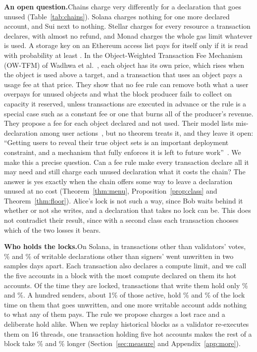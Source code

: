\documentclass[conference,compsoc]{IEEEtran}
\numberwithin{equation}{section}
\theoremstyle{plain}
\theoremstyle{definition}
\theoremstyle{remark}
\newcommand{\runin}[1]{\par\smallskip\noindent\textbf{#1.}\enspace}
\begin{document}
\runin{An open question}Chains charge very differently for a declaration that goes unused (Table~\ref{tab:chains}). Solana charges nothing for one more declared account, and Sui next to nothing. Stellar charges for every resource a transaction declares, with almost no refund, and Monad charges the whole gas limit whatever is used. A storage key on an Ethereum access list pays for itself only if it is read with probability at least \listThresholdKey{}. In the Object-Weighted Transaction Fee Mechanism (OW-TFM) of Wadhwa et al.~\cite{wadhwa2026perils}, each object has its own price, which rises when the object is used above a target, and a transaction that uses an object pays a usage fee at that price. They show that no fee rule can remove both what a user overpays for unused objects and what the block producer fails to collect on capacity it reserved, unless transactions are executed in advance or the rule is a special case such as a constant fee or one that burns all of the producer's revenue. They propose a fee for each object declared and not used. Their model lists mis-declaration among user actions~\cite[p.~1091]{wadhwa2026perils}, but no theorem treats it, and they leave it open: ``Getting users to reveal their true object sets is an important deployment constraint, and a mechanism that fully enforces it is left to future work''~\cite[pp.~1100--1101]{wadhwa2026perils}. We make this a precise question. Can a fee rule make every transaction declare all it may need and still charge each unused declaration what it costs the chain? The answer is yes exactly when the chain offers some way to leave a declaration unused at no cost (Theorem~\ref{thm:menu}, Proposition~\ref{prop:class} and Theorem~\ref{thm:floor}). Alice's lock is not such a way, since Bob waits behind it whether or not she writes, and a declaration that takes no lock can be. This does not contradict their result, since with a second class each transaction chooses which of the two losses it bears.

\runin{Who holds the locks}On Solana, in transactions other than validators' votes, \notWrittenA\% and \notWrittenB\% of writable declarations other than signers' went unwritten in two samples \sampleGapDays{} days apart. Each transaction also declares a compute limit, and we call the five accounts in a block with the most compute declared on them its hot accounts. Of the time they are locked, transactions that write them hold only \hotWrittenA\% and \hotWrittenB\%. A hundred senders, about 1\% of those active, hold \topHundredUnwrittenA\% and \topHundredUnwrittenB\% of the lock time on them that goes unwritten, and one more writable account adds nothing to what any of them pays. The rule we propose charges a lost race and a deliberate hold alike. When we replay historical blocks as a validator re-executes them on 16 threads, one transaction holding five hot accounts makes the rest of a block take \occFirmFiveA\% and \occFirmFiveB\% longer (Section~\ref{sec:measure} and Appendix~\ref{app:more}).
\end{document}
